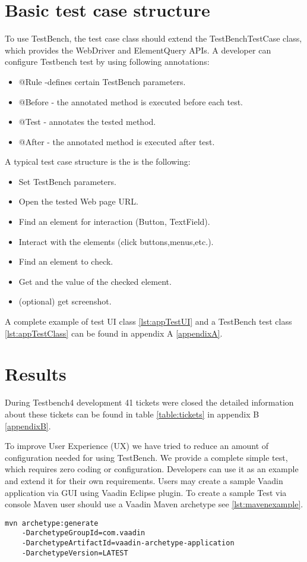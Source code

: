 \section {Basic test case structure}
To use TestBench, the test case class should extend the TestBenchTestCase class,
which provides the WebDriver and ElementQuery APIs. A developer
can configure Testbench test by using following annotations:
\begin{itemize}
  \item @Rule -defines certain TestBench parameters.
  \item @Before - the annotated method is executed before each test.
  \item @Test - annotates the tested method.
  \item @After - the annotated method is executed after test.
\end{itemize}

A typical test case structure is the is the following:
\begin{itemize}
  \item Set TestBench parameters.
  \item Open the tested Web page URL.
  \item Find an element for interaction (Button, TextField).
  \item Interact with the elements (click buttons,menus,etc.).
  \item Find an element to check.
  \item Get and the value of the checked element.
  \item (optional) get screenshot.
\end{itemize}

A complete example of test UI class \ref{lst:appTestUI}  and a TestBench test
class \ref{lst:appTestClass} can be found in appendix A \ref{appendixA}.

\section {Results}
During Testbench4 development 41 tickets were closed the detailed information
about these tickets can be found in table \ref{table:tickets} in
appendix B \ref{appendixB}. 

To improve User Experience (UX) we have tried to reduce an amount of
configuration needed for using TestBench. We provide a complete simple test,
which requires zero coding or configuration. Developers can use it as an example
and extend it for their own requirements. Users may create a sample
Vaadin application via GUI using Vaadin Eclipse plugin.
To create a sample Test via console Maven user should use a Vaadin Maven
archetype see \ref{lst:mavenexample}.
\lstset{style=console}
\begin{lstlisting}[caption=Create Vaadin sample application command.,label={lst:mavenexample}]
mvn archetype:generate 
	-DarchetypeGroupId=com.vaadin
	-DarchetypeArtifactId=vaadin-archetype-application
	-DarchetypeVersion=LATEST
\end{lstlisting}

